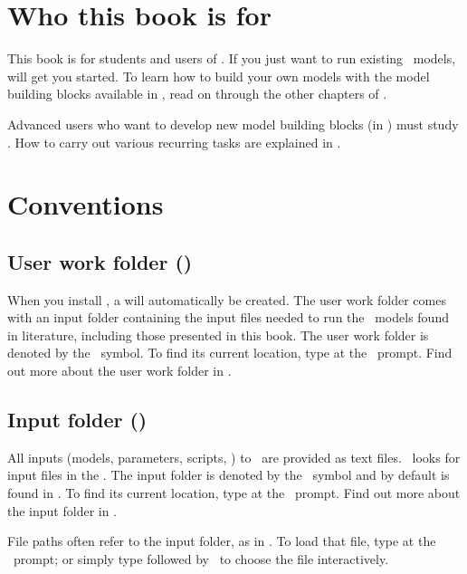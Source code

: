 \section{Who this book is for}

This book is for students and users of \US. If you just want to run existing \US\ models,  will get you started. To learn how to build your own models with the model building blocks available in \US, read on through the other chapters of .

Advanced users who want to develop new model building blocks (in \CPP) must study . How to carry out various recurring tasks are explained in . 

\section{Conventions}

\subsection{User work folder (\ushome)}
When you install \US, a  will automatically be created. The user work folder comes with an input folder containing the input files needed to run the \US\ models found in literature, including those presented in this book. The user work folder is denoted by the \ushome\ symbol. To find its current location, type  at the \US\ prompt. Find out more about the user work folder in .  

\subsection{Input folder ()}
All inputs (models, parameters, scripts, \etc) to \US\ are provided as text files. \US\ looks for input files in the . The input folder is denoted by the \ symbol and by default is found in . To find its current location, type  at the \US\ prompt. Find out more about the input folder in .  

File paths often refer to the input folder, as in . To load that file, type  at the \US\ prompt; or simply type  followed by \autofillkey\ to choose the file interactively. 

